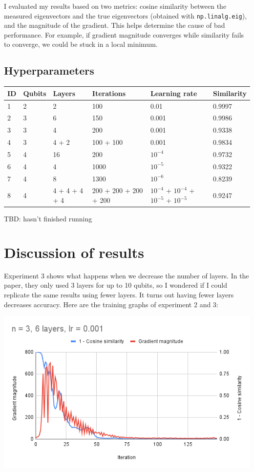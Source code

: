 \documentclass{article}
\begin{document}
I evaluated my results based on two metrics: cosine similarity between the
measured eigenvectors and the true eigenvectors (obtained with
\verb|np.linalg.eig|), and the magnitude of the gradient. This helps determine
the cause of bad performance. For example, if gradient magnitude converges while
similarity fails to converge, we could be stuck in a local minimum. 

\subsection*{Hyperparameters}

\renewcommand{\arraystretch}{1.5}
\begin{tabular}{|l|l|l|l|l|l|}
  \hline
  ID & Qubits & Layers & Iterations & Learning rate & Similarity \\
  \hline
  1 & 2 & 2 & 100 & 0.01 & 0.9997 \\
  \hline
  2 & 3 & 6 & 150 & 0.001 & 0.9986 \\
  \hline
  3 & 3 & 4 & 200 & 0.001 & 0.9338 \\
  \hline
  4 & 3 & 4 + 2 & 100 + 100 & 0.001 & 0.9834 \\
  \hline
  5 & 4 & 16 & 200 & \( 10^{-4} \) & 0.9732 \\
  \hline
  6 & 4 & 4 & 1000 & \( 10^{-5} \) & 0.9322 \\
  \hline
  7 & 4 & 8 & 1300 & \( 10^{-6} \) & 0.8239 \\
  \hline
  8 & 4 & 4 + 4 + 4 + 4 & 200 + 200 + 200 + 200 & \( 10^{-4} \) + \( 10^{-4} \) + \( 10^{-5} \) + \( 10^{-5} \) & 0.9247 \\
  \hline
\end{tabular}

TBD: hasn't finished running

\section*{Discussion of results}

Experiment 3 shows what happens when we decrease the number of layers. In the
paper, they only used 3 layers for up to 10 qubits, so I wondered if I could
replicate the same results using fewer layers. It turns out having fewer layers
decreases accuracy. Here are the training graphs of experiment 2 and 3:

\includegraphics[width=0.8\linewidth]{img/n3l6r3.png}
\end{document}
